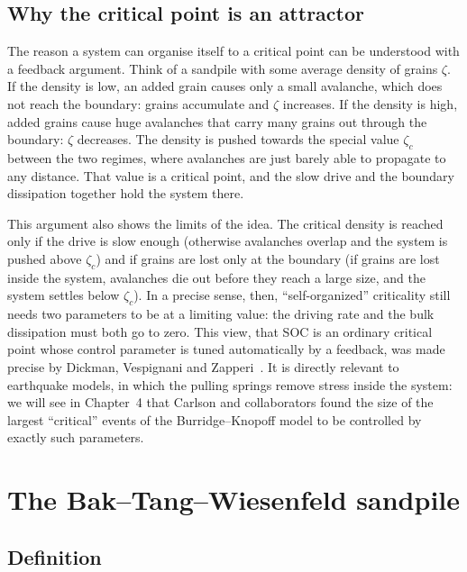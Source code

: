 \subsection{Why the critical point is an attractor}

The reason a system can organise itself to a critical point can be understood with a feedback argument.
Think of a sandpile with some average density of grains $\zeta$. If the density is low, an added grain causes
only a small avalanche, which does not reach the boundary: grains accumulate and $\zeta$ increases. If the
density is high, added grains cause huge avalanches that carry many grains out through the boundary: $\zeta$
decreases. The density is pushed towards the special value $\zeta_c$ between the two regimes, where avalanches
are just barely able to propagate to any distance. That value is a critical point, and the slow drive and the
boundary dissipation together hold the system there.

This argument also shows the limits of the idea. The critical density is reached only if the drive is slow
enough (otherwise avalanches overlap and the system is pushed above $\zeta_c$) and if grains are lost only at the
boundary (if grains are lost inside the system, avalanches die out before they reach a large size, and the
system settles below $\zeta_c$). In a precise sense, then, ``self-organized'' criticality still needs two
parameters to be at a limiting value: the driving rate and the bulk dissipation must both go to zero. This view,
that SOC is an ordinary critical point whose control parameter is tuned automatically by a feedback, was made
precise by Dickman, Vespignani and Zapperi~\cite{DickmanVespignaniZapperi1998}. It is directly relevant to
earthquake models, in which the pulling springs remove stress inside the system: we will see in Chapter~4 that
Carlson and collaborators found the size of the largest ``critical'' events of the Burridge--Knopoff model to be
controlled by exactly such parameters.

\section{The Bak--Tang--Wiesenfeld sandpile}
\label{sec:btw-def}

\subsection{Definition}

